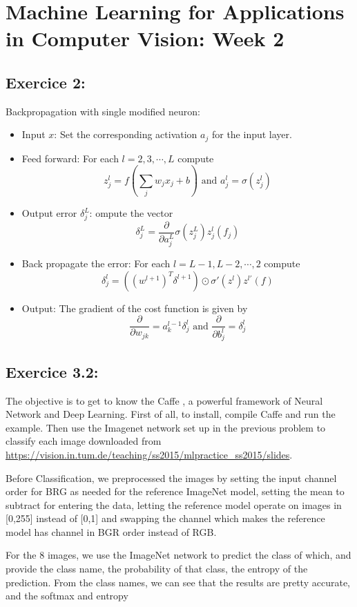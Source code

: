 \documentclass[12pt,a4paper,twoside]{article}
\begin{document}
\section*{Machine Learning for Applications \\
in Computer Vision: Week 2}
\hrulefill

\subsection*{Exercice 2:}
Backpropagation with single modified neuron:
\begin{itemize}
\item Input $x$: Set the corresponding activation $a_{j}$ for the input layer.
\item Feed forward: For each $l = 2,3,\cdots,L$ compute
\[z_{j}^{l} = f\left(\sum_{j} w_{j} x_{j}+b\right) \text{ and } a_{j}^{l} = \sigma(z_{j}^{l})\]
\item Output error $\delta_{j}^{L}$: ompute the vector
\[ \delta_{j}^{L} = \frac{\partial }{\partial a_{j}^{L}} \sigma(z_{j}^{L}) z_{j}^{l} (f_{j})\]
\item Back propagate the error: For each $l = L-1, L-2, \cdots , 2$ compute
  \[ \delta_{j}^{l} = ((w^{l+1})^{T}\delta^{l+1}) \odot \sigma'(z^{l})z^{l'}(f)\]
\item Output: The gradient of the cost function is given by
\[\frac{\partial }{\partial w_{jk}} = a_{k}^{l-1}\delta_{j}^{l} \text{ and }\frac{\partial}{\partial b_{j}^{l}}= \delta_{j}^{l}\]
\end{itemize}

\subsection*{Exercice 3.2:}
The objective is to get to know the Caffe , a powerful framework of Neural Network and Deep Learning. First of all, to install, compile Caffe and run the example. Then use the Imagenet network  set up in the previous problem to classify each image downloaded from \url{https://vision.in.tum.de/teaching/ss2015/mlpractice_ss2015/slides}.

Before Classification, we preprocessed the images by setting the input channel order for BRG as needed for the reference ImageNet model, setting the mean to subtract for entering the data, letting the reference model operate on images in [0,255] instead of [0,1] and swapping the channel which makes the reference model has channel in BGR order instead of RGB.  

For the 8 images, we use the ImageNet network to predict the class of which, and provide the class name, the probability of that class, the entropy of the prediction. From the class names, we can see that the results are pretty accurate,  and the softmax  and entropy
\end{document}
